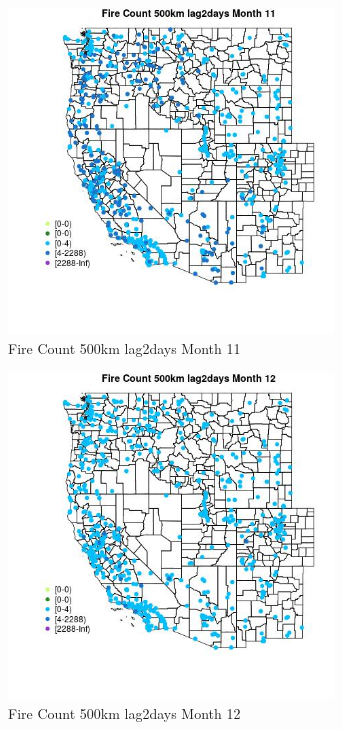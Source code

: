 \begin{figure} 
\centering  
\includegraphics[width=0.77\textwidth]{Code_Outputs/Report_ML_input_PM25_Step4_part_e_de_duplicated_aves_compiled_2019-05-21wNAs_MapObsMo11Fire_Count_500km_lag2days.jpg} 
\caption{\label{fig:Report_ML_input_PM25_Step4_part_e_de_duplicated_aves_compiled_2019-05-21wNAsMapObsMo11Fire_Count_500km_lag2days}Fire Count 500km lag2days Month 11} 
\end{figure} 
 

\begin{figure} 
\centering  
\includegraphics[width=0.77\textwidth]{Code_Outputs/Report_ML_input_PM25_Step4_part_e_de_duplicated_aves_compiled_2019-05-21wNAs_MapObsMo12Fire_Count_500km_lag2days.jpg} 
\caption{\label{fig:Report_ML_input_PM25_Step4_part_e_de_duplicated_aves_compiled_2019-05-21wNAsMapObsMo12Fire_Count_500km_lag2days}Fire Count 500km lag2days Month 12} 
\end{figure} 
 

